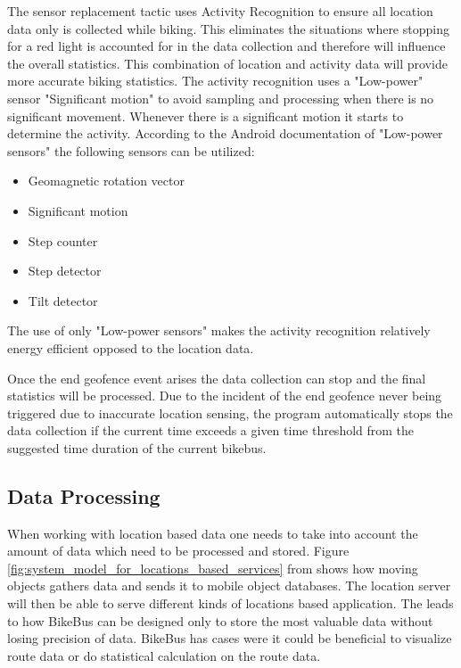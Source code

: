 The sensor replacement tactic uses Activity Recognition to ensure all location data only is collected while biking. This eliminates the situations where stopping for a red light is accounted for in the data collection and therefore will influence the overall statistics. This combination of location and activity data will provide more accurate biking statistics. 
The activity recognition uses a "Low-power" sensor "Significant motion" to avoid sampling and processing when there is no significant movement. Whenever there is a significant motion it starts to determine the activity.
According to the Android documentation of "Low-power sensors" \cite{androidLow} the following sensors can be utilized:
\begin{itemize}
    \item Geomagnetic rotation vector
    \item Significant motion
    \item Step counter
    \item Step detector
    \item Tilt detector
\end{itemize}
The use of only "Low-power sensors" makes the activity recognition relatively energy efficient opposed to the location data.

Once the end geofence event arises the data collection can stop and the final statistics will be processed. Due to the incident of the end geofence never being triggered due to inaccurate location sensing, the program automatically stops the data collection if the current time exceeds a given time threshold from the suggested time duration of the current bikebus.

\subsection{Data Processing}
\label{sec:data_processing}

When working with location based data one needs to take into account the amount of data which need to be processed and stored. Figure \ref{fig:system_model_for_locations_based_services} from \cite{Lee2011} shows how moving objects gathers data and sends it to mobile object databases. The location server will then be able to serve different kinds of locations based application. The leads to how BikeBus can be designed only to store the most valuable data without losing precision of data. BikeBus has cases were it could be beneficial to visualize route data or do statistical calculation on the route data.   

